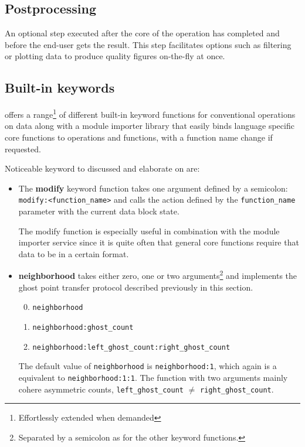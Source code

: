\subsection{Postprocessing}
An optional step executed after the core of the operation has completed and before the end-user gets the result. This step facilitates options such as filtering or plotting data to produce quality figures on-the-fly at once.

\subsection{Built-in keywords}
\CodeName offers a range\footnote{Effortlessly extended when demanded} of different built-in keyword functions for conventional operations on data along with a module importer library that easily binds language specific core functions to \CodeName operations and functions, with a function name change if requested.
\newline

\noindent
Noticeable keyword to discussed and elaborate on are:
\vspace*{2mm}

\begin{itemize}
	\item The \textbf{modify} keyword function takes one argument defined by a semicolon: \texttt{modify:<function\_name>} and calls the action defined by the \texttt{function\_name} parameter with the current data block state. 
	
	The modify function is especially useful in combination with the module importer service since it is quite often that general core functions require that data to be in a certain format.
	\item \textbf{neighborhood} takes either zero, one or two arguments\footnote{Separated by a semicolon as for the other keyword functions.} and implements the ghost point transfer protocol described previously in this section.
	\begin{enumerate}
		\setcounter{enumi}{-1}
		\item \texttt{neighborhood}
		\item \texttt{neighborhood:ghost\_count}
		\item \texttt{neighborhood:left\_ghost\_count:right\_ghost\_count}
	\end{enumerate}
	The default value of \texttt{neighborhood} is \texttt{neighborhood:1}, which again is a equivalent to \texttt{neighborhood:1:1}. The function with two arguments mainly cohere asymmetric counts, \ie \texttt{left\_ghost\_count} $\neq$ \texttt{right\_ghost\_count}.	
\end{itemize}

